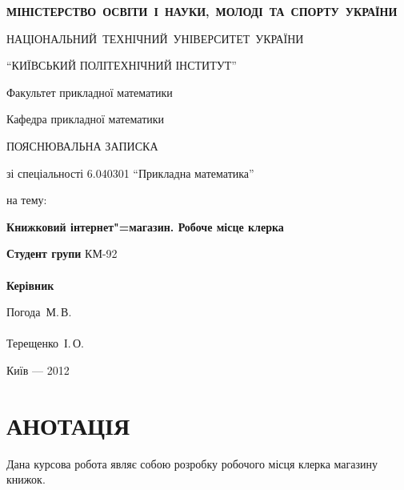 \documentclass[a4paper,notitlepage,headsepline,pdftex,oneside]{report}
\newcommand{\setfontsize}[1]{\fontsize{#1pt}{#1pt}\selectfont}
\newcommand{\uChapter}[1]{\chapter*{#1}\pagestyle{fancy}\renewcommand{\baselinestretch}{1.5}\setfontsize{14pt}}
\begin{document}
\setfontsize{14pt}
\renewcommand{\baselinestretch}{1.5}
\begin{titlepage}
  \begin{center}
\setfontsize{14pt}
\renewcommand{\baselinestretch}{1.5}
{\bf
    \mbox{\MakeUppercase{Міністерство освіти і науки, молоді та спорту
    України}}

    \mbox{\MakeUppercase{Національний технічний університет України}}

    \MakeUppercase{``Київський політехнічний інститут''}

    \vspace{2cm}


    Факультет прикладної математики

    Кафедра прикладної математики

    \vfill

    ПОЯСНЮВАЛЬНА ЗАПИСКА
  }

    зі спеціальності 6.040301 ``Прикладна математика''

    на тему:

    \textbf{Книжковий інтернет"=магазин. Робоче місце клерка}
  \end{center}

  \vfill

  \begin{minipage}{0.4\textwidth}
  \noindent
  \textbf{Студент групи} КМ-92\\
  \hspace{1cm}\\
  \noindent
  \textbf{Керівник}\\
  \end{minipage}
  \begin{minipage}{0.4\textwidth}
    \noindent
    Погода~М.\,В.\hfill\underline{\hspace{1.5cm}}\\
    \hspace{1cm}\\
    \noindent
    Терещенко~І.\,О.\hfill\underline{\hspace{1.5cm}}\\
  \end{minipage}

  \vfill

  \begin{center}
    Київ --- 2012
  \end{center}
\end{titlepage}
\thispagestyle{empty}
\clearpage
\uChapter{АНОТАЦІЯ}
  Дана курсова робота являє собою розробку робочого місця клерка магазину
  книжок.
\end{document}
